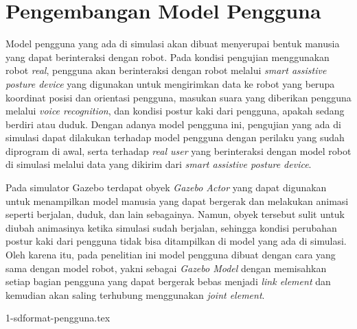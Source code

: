 \section{Pengembangan Model Pengguna}
\label{sec:modelpengguna}

Model pengguna yang ada di simulasi akan dibuat menyerupai bentuk manusia yang dapat berinteraksi dengan robot.
Pada kondisi pengujian menggunakan robot \emph{real},
  pengguna akan berinteraksi dengan robot melalui \emph{smart assistive posture device} yang digunakan untuk mengirimkan data ke robot yang berupa koordinat posisi dan orientasi pengguna,
  masukan suara yang diberikan pengguna melalui \emph{voice recognition},
  dan kondisi postur kaki dari pengguna, apakah sedang berdiri atau duduk.
Dengan adanya model pengguna ini,
  pengujian yang ada di simulasi dapat dilakukan terhadap model pengguna dengan perilaku yang sudah diprogram di awal,
  serta terhadap \emph{real user} yang berinteraksi dengan model robot di simulasi melalui data yang dikirim dari \emph{smart assistive posture device}.

Pada simulator Gazebo terdapat obyek \emph{Gazebo Actor} yang dapat digunakan untuk menampilkan model manusia yang dapat bergerak dan melakukan animasi seperti berjalan, duduk, dan lain sebagainya.
Namun, obyek tersebut sulit untuk diubah animasinya ketika simulasi sudah berjalan,
  sehingga kondisi perubahan postur kaki dari pengguna tidak bisa ditampilkan di model yang ada di simulasi.
Oleh karena itu, pada penelitian ini model pengguna dibuat dengan cara yang sama dengan model robot,
  yakni sebagai \emph{Gazebo Model} dengan memisahkan setiap bagian pengguna yang dapat bergerak bebas menjadi \emph{link element} dan kemudian akan saling terhubung menggunakan \emph{joint element}.

{1-sdformat-pengguna.tex}
